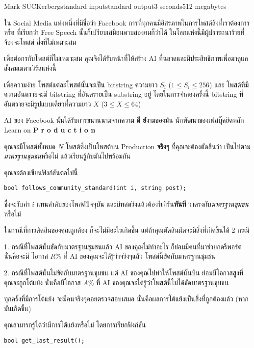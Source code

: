 \documentclass[11pt,a4paper]{article}
\begin{document}
\begin{problem}{Mark SUCKerberg}{standard input}{standard output}{3 seconds}{512 megabytes}

ใน Social Media แห่งหนึ่งที่มีชื่อว่า Facebook การที่ทุกคนมีอิสรภาพในการโพสต์สิ่งที่เราต้องการหรือ
ที่เรียกว่า Free Speech นั้นก็เปรียบเสมือนดาบสองคมก็ว่าได้ ในโลกแห่งนี้มีผู้ปรารถนาร้ายที่จ้องจะโพสต์
สิ่งที่ไม่เหมาะสม

เพื่อต่อกรกับโพสต์ที่ไม่เหมาะสม คุณจึงได้รับหน้าที่ให้สร้าง AI ที่ฉลาดและมีประสิทธิภาพเพื่อมาดูแล
สังคมเมตาเวิร์สแห่งนี้

เพื่อความง่าย โพสต์แต่ละโพสต์นั้นจะเป็น bitstring ความยาว $S_i$ ($1 \le S_i \le 256$) และ
โพสต์ที่มีความอันตรายจะมี bitstring ที่อันตรายเป็น substring อยู่ โดยในการจำลองครั้งนี้
bitstring ที่อันตรายจะมีรูปแบบเดียวที่ความยาว $X$ ($3 \le X \le 64$)

AI ของ Facebook นั้นได้รับการขนานนามจากความ \textbf{ดี ย์}งามของมัน
นักพัฒนาของเฟสบุ๊คยึดหลัก Learn on \textbf{P r o d u c t i o n}

คุณจะมีโพสต์ทั้งหมด $N$ โพสต์ซึ่งเป็นโพสต์บน Production \textbf{จริงๆ} ที่คุณจะต้องตัดสินว่า
เป็นไปตาม\textit{มาตรฐานชุมชน}หรือไม่ แล้วเรียนรู้กับมันไปพร้อมกัน

คุณจะต้องเขียนฟังก์ชันต่อไปนี้

\begin{verbatim}
bool follows_community_standard(int i, string post);
\end{verbatim}

ซึ่งจะรับค่า $i$ แทนลำดับของโพสต์ปัจจุบัน และบิทสตริงแล้วต้องรีเทิร์น\textbf{ทันที}
ว่าตรงกับ\textit{มาตรฐานชุมชน}หรือไม่

ในกรณีที่การตัดสินของคุณถูกต้อง ก็จะไม่มีอะไรเกิดขึ้น แต่ถ้าคุณตัดสินผิดจะมีสิ่งที่เกิดขึ้นได้ 2 กรณี

1. กรณีที่โพสต์นั้นขัดกับมาตรฐานชุมชนแล้ว AI ของคุณไม่ทำอะไร ก็ย่อมมีคนที่มาช่วยกดรีพอร์ต นั่นคือจะมี
โอกาส $R\%$ ที่ AI ของคุณจะได้รู้ว่าจริงๆแล้ว โพสต์นี้ขัดกับมาตรฐานชุมชน

2. กรณีที่โพสต์นั้นไม่ขัดกับมาตรฐานชุมชน แต่ AI ของคุณไปทำให้โพสต์นั้นบิน
ย่อมมีโอกาสสูงที่คุณจะถูกโต้แย้ง นั่นคือมีโอกาส $A\%$ ที่ AI
ของคุณจะได้รู้ว่าโพสต์นี้ไม่ได้ขัดมาตรฐานชุมชน

ทุกครั้งที่มีการโต้แย้ง จะมีคนจริงๆคอยตรวจสอบเสมอ นั่นคือผลการโต้แย้งเป็นสิ่งที่ถูกต้องแล้ว 
(หากมันเกิดขึ้น)

คุณสามารถรู้ได้ว่ามีการโต้แย้งหรือไม่ โดยการเรียกฟังก์ชัน

\begin{verbatim}
bool get_last_result();
\end{verbatim}


\end{problem}
\end{document}
